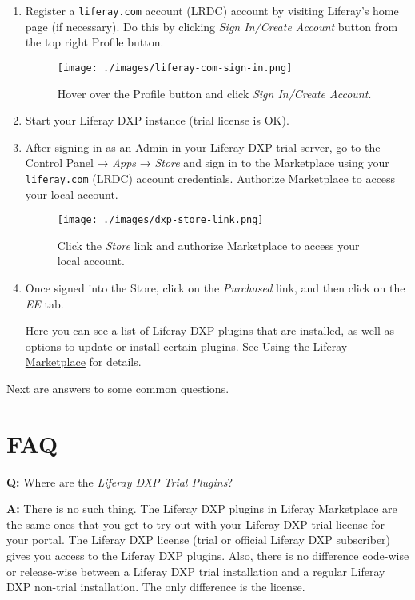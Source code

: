 \begin{enumerate}
\def\labelenumi{\arabic{enumi}.}
\item
  Register a \texttt{liferay.com} account (LRDC) account by visiting
  Liferay's home page (if necessary). Do this by clicking \emph{Sign
  In/Create Account} button from the top right Profile button.

  \begin{figure}
  \centering
  \texttt{[image: ./images/liferay-com-sign-in.png]}
  \caption{Hover over the Profile button and click \emph{Sign In/Create
  Account}.}
  \end{figure}
\item
  Start your Liferay DXP instance (trial license is OK).
\item
  After signing in as an Admin in your Liferay DXP trial server, go to
  the Control Panel → \emph{Apps} → \emph{Store} and sign in to the
  Marketplace using your \texttt{liferay.com} (LRDC) account
  credentials. Authorize Marketplace to access your local account.

  \begin{figure}
  \centering
  \texttt{[image: ./images/dxp-store-link.png]}
  \caption{Click the \emph{Store} link and authorize Marketplace to
  access your local account.}
  \end{figure}
\item
  Once signed into the Store, click on the \emph{Purchased} link, and
  then click on the \emph{EE} tab.

  Here you can see a list of Liferay DXP plugins that are installed, as
  well as options to update or install certain plugins. See
  \href{/docs/7-2/user/-/knowledge_base/u/using-the-liferay-marketplace}{Using
  the Liferay Marketplace} for details.
\end{enumerate}

Next are answers to some common questions.

\section{FAQ}\label{faq}

\textbf{Q:} Where are the \emph{Liferay DXP Trial Plugins}?

\textbf{A:} There is no such thing. The Liferay DXP plugins in Liferay
Marketplace are the same ones that you get to try out with your Liferay
DXP trial license for your portal. The Liferay DXP license (trial or
official Liferay DXP subscriber) gives you access to the Liferay DXP
plugins. Also, there is no difference code-wise or release-wise between
a Liferay DXP trial installation and a regular Liferay DXP non-trial
installation. The only difference is the license.

